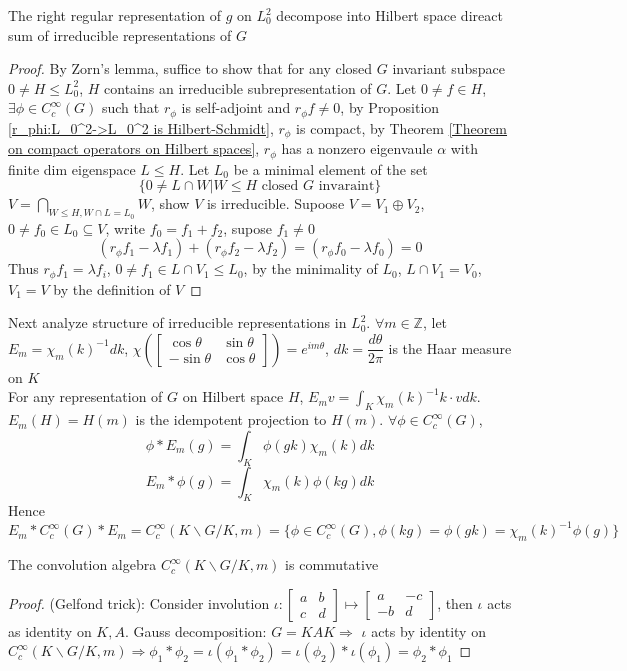 \documentclass[../main.tex]{subfiles}
\begin{document}
\begin{theorem}
The right regular representation of $g$ on $L_0^2$ decompose into Hilbert space direact sum of irreducible representations of $G$
\end{theorem}

\begin{proof}
By Zorn's lemma, suffice to show that for any closed $G$ invariant subspace $0\neq H\leq L_0^2$, $H$ contains an irreducible subrepresentation of $G$. Let $0\neq f\in H$, $\exists\phi\in C_c^\infty(G)$ such that $r_\phi$ is self-adjoint and $r_\phi f\neq0$, by Proposition \ref{r_phi:L_0^2->L_0^2 is Hilbert-Schmidt}, $r_\phi$ is compact, by Theorem \ref{Theorem on compact operators on Hilbert spaces}, $r_\phi$ has a nonzero eigenvaule $\alpha$ with finite dim eigenspace $L\leq H$. Let $L_0$ be a minimal element of the set
\[\{0\neq L\cap W|W\leq H\text{ closed $G$ invaraint}\}\]
$\displaystyle V=\bigcap_{W\leq H,W\cap L=L_0} W$, show $V$ is irreducible. Supoose $V=V_1\oplus V_2$, $0\neq f_0\in L_0\subseteq V$, write $f_0=f_1+f_2$, supose $f_1\neq0$
\[(r_\phi f_1-\lambda f_1)+(r_\phi f_2-\lambda f_2)=(r_\phi f_0-\lambda f_0)=0\]
Thus $r_\phi f_1=\lambda f_i$, $0\neq f_1\in L\cap V_1\leq L_0$, by the minimality of $L_0$, $L\cap V_1=V_0$, $V_1=V$ by the definition of $V$
\end{proof}

Next analyze structure of irreducible representations in $L_0^2$. $\forall m\in\mathbb Z$, let $E_m=\chi_m(k)^{-1}dk$, $\chi\left(\begin{bmatrix}
\cos\theta&\sin\theta \\
-\sin\theta&\cos\theta
\end{bmatrix}\right)=e^{im\theta}$, $dk=\dfrac{d\theta}{2\pi}$ is the Haar measure on $K$ \\
For any representation of $G$ on Hilbert space $H$, $E_mv=\displaystyle\int_K\chi_m(k)^{-1}k\cdot vdk$. $E_m(H)=H(m)$ is the idempotent projection to $H(m)$. $\forall \phi\in C_c^\infty(G)$, \[\phi* E_m(g)=\int_K\phi(gk)\chi_m(k)dk\]
\[E_m*\phi(g)=\int_K\chi_m(k)\phi(kg)dk\]
Hence $E_m*C^\infty_c(G)*E_m=C_c^\infty(K\backslash G/K,m)=\{\phi\in C_c^\infty(G),\phi(kg)=\phi(gk)=\chi_m(k)^{-1}\phi(g)\}$

\begin{lemma}\label{C_c^infty(K G /K,m) is commutative}
The convolution algebra $C_c^\infty(K\backslash G/K,m)$ is commutative
\end{lemma}

\begin{proof}
(Gelfond trick): Consider involution $\iota:\begin{bmatrix}
a&b\\
c&d
\end{bmatrix}\mapsto\begin{bmatrix}
a&-c\\
-b&d
\end{bmatrix}$, then $\iota$ acts as identity on $K,A$. Gauss decomposition: $G=KAK\Rightarrow$ $\iota$ acts by identity on $C_c^\infty(K\backslash G/K,m)\Rightarrow\phi_1*\phi_2=\iota(\phi_1*\phi_2)=\iota(\phi_2)*\iota(\phi_1)=\phi_2*\phi_1$
\end{proof}
\end{document}

